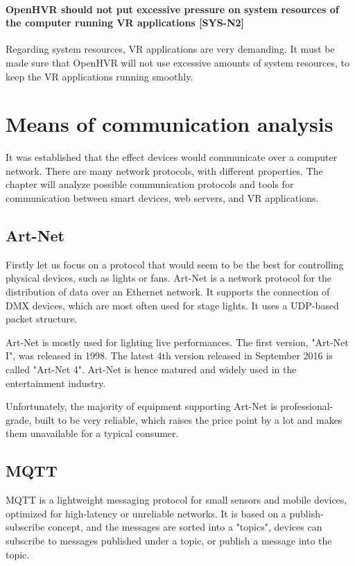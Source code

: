 \hypertarget{x-\textbf{openhvr-should-not-put-excessive-pressure-on-system-resources-of-the-computer-running-vr-applications}-[sys-n2]}{\paragraph*{\textbf{OpenHVR should not put excessive pressure on system resources of the computer running VR applications} [SYS-N2]}}
Regarding system resources, VR applications are very demanding. It must be
made sure that OpenHVR will not use excessive amounts of system resources,
to keep the VR applications running smoothly.


\hypertarget{x-means-of-communication-analysis}{\section{Means of communication analysis}}
It was established that the effect devices would communicate over a computer network.
There are many network protocols, with different properties. The chapter will
analyze possible communication protocols and tools for communication
between smart devices, web servers, and VR applications.


\hypertarget{x-art-net}{\subsection{Art-Net}}
Firstly let us focus on a protocol that would seem to be the best for controlling
physical devices, such as lights or fans. Art-Net is a network protocol for
the distribution of data over an Ethernet network. It supports the connection of DMX
devices, which are most often used for stage lights. It uses a UDP-based packet
structure. \hyperlink{artnet}{}


Art-Net is mostly used for lighting live performances. The first version,
"Art-Net I", was released in 1998. The latest 4th version released
in September 2016
is called "Art-Net 4". Art-Net is hence matured and widely used in the
entertainment industry.


Unfortunately, the majority of equipment supporting Art-Net is
professional-grade, built to be very reliable, which raises the price point
by a lot and makes them unavailable for a typical consumer.


\hypertarget{x-mqtt}{\subsection{MQTT}}
MQTT is a lightweight messaging protocol for small sensors and mobile devices,
optimized for high-latency or unreliable networks. \hyperlink{mqtthp}{} It is
based on a publish-subscribe concept, and the messages are sorted into a "topics",
devices can subscribe to messages published under a topic, or publish
a message into the topic.



